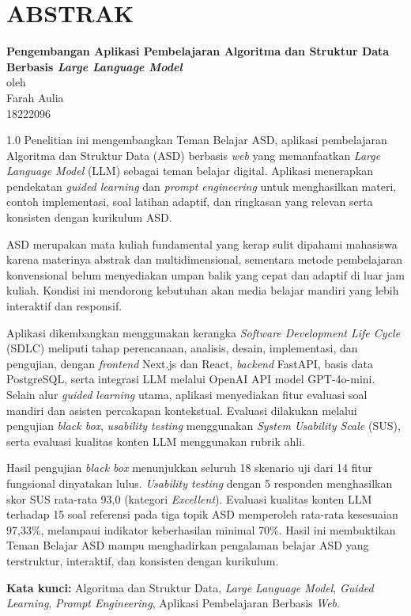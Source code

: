 \chapter*{ABSTRAK}

\begin{center}

    {\Large\bfseries Pengembangan Aplikasi Pembelajaran Algoritma dan Struktur Data Berbasis \textit{Large Language Model}}\\
    oleh \\
    \vspace{0.4cm}
    Farah Aulia\\
    18222096\\
\end{center}


\begin{spacing}{1.0}
Penelitian ini mengembangkan Teman Belajar ASD, aplikasi pembelajaran Algoritma dan Struktur Data (ASD) berbasis \textit{web} yang memanfaatkan \textit{Large Language Model} (LLM) sebagai teman belajar digital. Aplikasi menerapkan pendekatan \textit{guided learning} dan \textit{prompt engineering} untuk menghasilkan materi, contoh implementasi, soal latihan adaptif, dan ringkasan yang relevan serta konsisten dengan kurikulum ASD.

ASD merupakan mata kuliah fundamental yang kerap sulit dipahami mahasiswa karena materinya abstrak dan multidimensional, sementara metode pembelajaran konvensional belum menyediakan umpan balik yang cepat dan adaptif di luar jam kuliah. Kondisi ini mendorong kebutuhan akan media belajar mandiri yang lebih interaktif dan responsif.

Aplikasi dikembangkan menggunakan kerangka \textit{Software Development Life Cycle} (SDLC) meliputi tahap perencanaan, analisis, desain, implementasi, dan pengujian, dengan \textit{frontend} Next.js dan React, \textit{backend} FastAPI, basis data PostgreSQL, serta integrasi LLM melalui OpenAI API model GPT-4o-mini. Selain alur \textit{guided learning} utama, aplikasi menyediakan fitur evaluasi soal mandiri dan asisten percakapan kontekstual. Evaluasi dilakukan melalui pengujian \textit{black box}, \textit{usability testing} menggunakan \textit{System Usability Scale} (SUS), serta evaluasi kualitas konten LLM menggunakan rubrik ahli.

Hasil pengujian \textit{black box} menunjukkan seluruh 18 skenario uji dari 14 fitur fungsional dinyatakan lulus. \textit{Usability testing} dengan 5 responden menghasilkan skor SUS rata-rata 93,0 (kategori \textit{Excellent}). Evaluasi kualitas konten LLM terhadap 15 soal referensi pada tiga topik ASD memperoleh rata-rata kesesuaian 97,33\%, melampaui indikator keberhasilan minimal 70\%. Hasil ini membuktikan Teman Belajar ASD mampu menghadirkan pengalaman belajar ASD yang terstruktur, interaktif, dan konsisten dengan kurikulum.

\vspace{0.5em}
\noindent\textbf{Kata kunci:} Algoritma dan Struktur Data, \textit{Large Language Model}, \textit{Guided Learning}, \textit{Prompt Engineering}, Aplikasi Pembelajaran Berbasis \textit{Web}.
\end{spacing}
